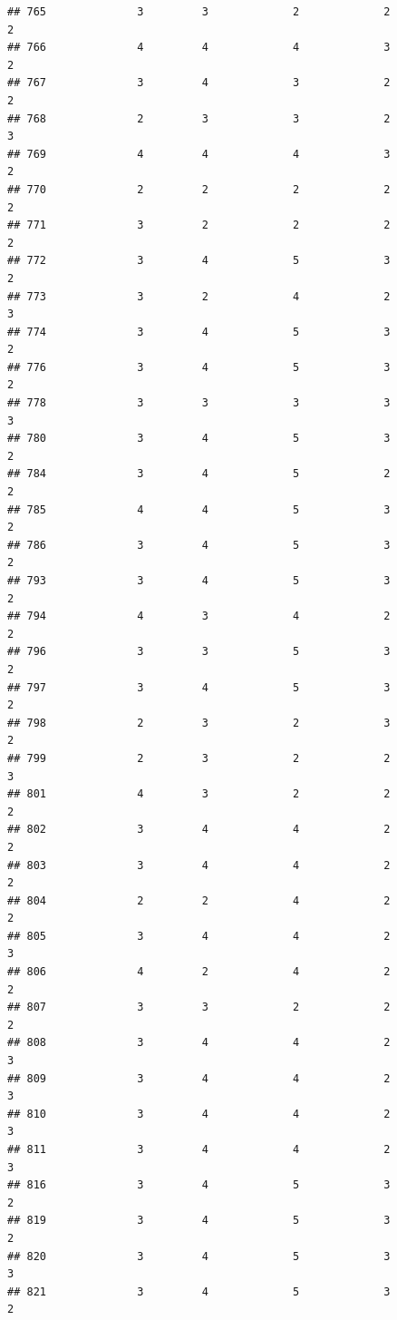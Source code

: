 \documentclass[
]{article}
\begin{document}
\begin{verbatim}
## 765              3         3             2             2           2
## 766              4         4             4             3           2
## 767              3         4             3             2           2
## 768              2         3             3             2           3
## 769              4         4             4             3           2
## 770              2         2             2             2           2
## 771              3         2             2             2           2
## 772              3         4             5             3           2
## 773              3         2             4             2           3
## 774              3         4             5             3           2
## 776              3         4             5             3           2
## 778              3         3             3             3           3
## 780              3         4             5             3           2
## 784              3         4             5             2           2
## 785              4         4             5             3           2
## 786              3         4             5             3           2
## 793              3         4             5             3           2
## 794              4         3             4             2           2
## 796              3         3             5             3           2
## 797              3         4             5             3           2
## 798              2         3             2             3           2
## 799              2         3             2             2           3
## 801              4         3             2             2           2
## 802              3         4             4             2           2
## 803              3         4             4             2           2
## 804              2         2             4             2           2
## 805              3         4             4             2           3
## 806              4         2             4             2           2
## 807              3         3             2             2           2
## 808              3         4             4             2           3
## 809              3         4             4             2           3
## 810              3         4             4             2           3
## 811              3         4             4             2           3
## 816              3         4             5             3           2
## 819              3         4             5             3           2
## 820              3         4             5             3           3
## 821              3         4             5             3           2

\end{verbatim}
\end{document}
